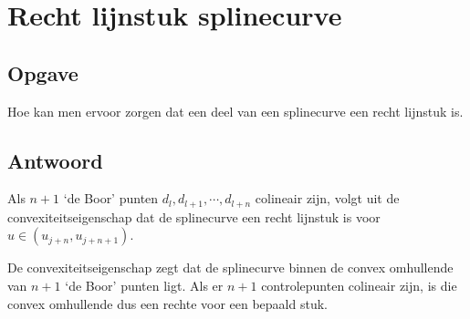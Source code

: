 \documentclass[examenvragen.tex]{subfiles}
\begin{document}
\section{Recht lijnstuk splinecurve}
\subsection{Opgave}
Hoe kan men ervoor zorgen dat een deel van een splinecurve een recht lijnstuk is.

\subsection{Antwoord}
Als $n+1$ `de Boor' punten $d_l,d_{l+1},\cdots,d_{l+n}$ colineair zijn, volgt uit de convexiteitseigenschap dat de splinecurve een recht lijnstuk is voor $u \in (u_{j+n},u_{j+n+1})$.

De convexiteitseigenschap zegt dat de splinecurve binnen de convex omhullende van $n+1$ `de Boor' punten ligt. Als er $n+1$ controlepunten colineair zijn, is die convex omhullende dus een rechte voor een bepaald stuk.
\end{document}
